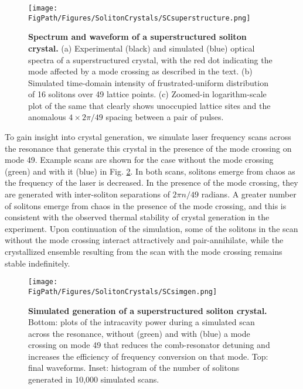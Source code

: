 \begin{figure}[htpb]
	\begin{center}
		\texttt{[image: \\FigPath/Figures/SolitonCrystals/SCsuperstructure.png]}
	\end{center}
	\caption[Spectrum and waveform of a superstructed soliton crystal]{\textbf{Spectrum and waveform of a superstructured soliton crystal.} (a) Experimental (black) and simulated (blue) optical spectra of a superstructured crystal, with the red dot indicating the mode affected by a mode crossing as described in the text. (b) Simulated time-domain intensity of frustrated-uniform distribution of 16 solitons over 49 lattice points. (c) Zoomed-in logarithm-scale plot of the same that clearly shows unoccupied lattice sites and the anomalous $4\times2\pi/49$ spacing between a pair of pulses.}
	\label{fig:SCsuperstructure}
\end{figure} 

To gain insight into crystal generation, we simulate laser frequency scans across the resonance that generate this crystal in the presence of the mode crossing on mode 49. Example scans are shown for the case without the mode crossing (green) and with it (blue) in Fig. \ref{fig:SCsimgen}. In both scans, solitons emerge from chaos as the frequency of the laser is decreased. In the presence of the mode crossing, they are generated with inter-soliton separations of $2\pi n/49$ radians. A greater number of solitons emerge from chaos in the presence of the mode crossing, and this is consistent with the observed thermal stability of crystal generation in the experiment. Upon continuation of the simulation, some of the solitons in the scan without the mode crossing interact attractively and pair-annihilate, while the crystallized ensemble resulting from the scan with the mode crossing remains stable indefinitely.

\begin{figure}[htpb]
	\begin{center}
		\texttt{[image: \\FigPath/Figures/SolitonCrystals/SCsimgen.png]}
	\end{center}
	\caption[Simulated generation of a superstructured soliton crystal]{\textbf{Simulated generation of a superstructured soliton crystal.} Bottom: plots of the intracavity power during a simulated scan across the resonance, without (green) and with (blue) a mode crossing on mode 49 that reduces the comb-resonator detuning and increases the efficiency of frequency conversion on that mode. Top: final waveforms. Inset: histogram of the number of solitons generated in 10,000 simulated scans.}
	\label{fig:SCsimgen}
\end{figure} 

